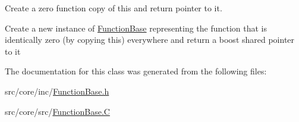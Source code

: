 Create a zero function copy of {\ttfamily this} and return pointer to it. 

Create a new instance of \hyperlink{class_q_u_e_s_o_1_1_function_base}{Function\-Base} representing the function that is identically zero (by copying {\ttfamily this}) everywhere and return a boost shared pointer to it 

The documentation for this class was generated from the following files\-:\begin{DoxyCompactItemize}
\item 
src/core/inc/\hyperlink{_function_base_8h}{Function\-Base.\-h}\item 
src/core/src/\hyperlink{_function_base_8_c}{Function\-Base.\-C}\end{DoxyCompactItemize}
